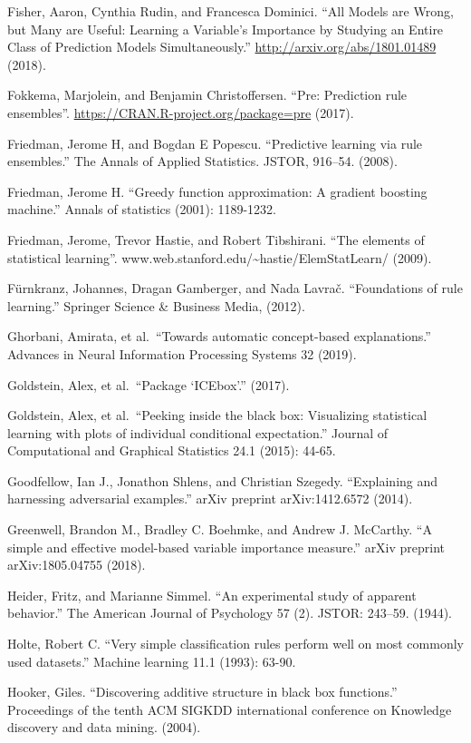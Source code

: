 \documentclass[
  12pt,
]{krantz}
\begin{document}
Fisher, Aaron, Cynthia Rudin, and Francesca Dominici. ``All Models are Wrong, but Many are Useful: Learning a Variable's Importance by Studying an Entire Class of Prediction Models Simultaneously.'' \url{http://arxiv.org/abs/1801.01489} (2018).

Fokkema, Marjolein, and Benjamin Christoffersen. ``Pre: Prediction rule ensembles''. \url{https://CRAN.R-project.org/package=pre} (2017).

Friedman, Jerome H, and Bogdan E Popescu. ``Predictive learning via rule ensembles.'' The Annals of Applied Statistics. JSTOR, 916--54. (2008).

Friedman, Jerome H. ``Greedy function approximation: A gradient boosting machine.'' Annals of statistics (2001): 1189-1232.

Friedman, Jerome, Trevor Hastie, and Robert Tibshirani. ``The elements of statistical learning''. www.web.stanford.edu/\textasciitilde hastie/ElemStatLearn/ (2009).

Fürnkranz, Johannes, Dragan Gamberger, and Nada Lavrač. ``Foundations of rule learning.'' Springer Science \& Business Media, (2012).

Ghorbani, Amirata, et al.~``Towards automatic concept-based explanations.'' Advances in Neural Information Processing Systems 32 (2019).

Goldstein, Alex, et al.~``Package `ICEbox'.'' (2017).

Goldstein, Alex, et al.~``Peeking inside the black box: Visualizing statistical learning with plots of individual conditional expectation.'' Journal of Computational and Graphical Statistics 24.1 (2015): 44-65.

Goodfellow, Ian J., Jonathon Shlens, and Christian Szegedy. ``Explaining and harnessing adversarial examples.'' arXiv preprint arXiv:1412.6572 (2014).

Greenwell, Brandon M., Bradley C. Boehmke, and Andrew J. McCarthy. ``A simple and effective model-based variable importance measure.'' arXiv preprint arXiv:1805.04755 (2018).

Heider, Fritz, and Marianne Simmel. ``An experimental study of apparent behavior.'' The American Journal of Psychology 57 (2). JSTOR: 243--59. (1944).

Holte, Robert C. ``Very simple classification rules perform well on most commonly used datasets.'' Machine learning 11.1 (1993): 63-90.

Hooker, Giles. ``Discovering additive structure in black box functions.'' Proceedings of the tenth ACM SIGKDD international conference on Knowledge discovery and data mining. (2004).
\end{document}
